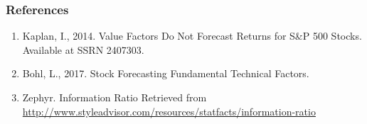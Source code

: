 \documentclass[]{article}
\begin{document}
\hypertarget{references}{%
\subsubsection{References}\label{references}}

\begin{enumerate}
\def\labelenumi{\arabic{enumi}.}
\item
  Kaplan, I., 2014. Value Factors Do Not Forecast Returns for S\&P 500
  Stocks. Available at SSRN 2407303.
\item
  Bohl, L., 2017. Stock Forecasting Fundamental Technical Factors.
\item
  Zephyr. Information Ratio Retrieved from
  \url{http://www.styleadvisor.com/resources/statfacts/information-ratio}
\end{enumerate}
\end{document}
